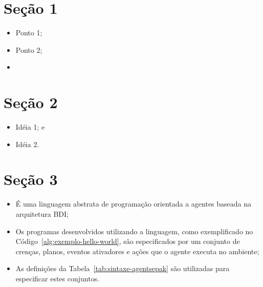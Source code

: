 \documentclass[a0,portrait]{a0poster}
\begin{document}
\begin{multicols}{2} 
\color{NavyBlue}
\section*{\huge Seção 1}
\color{Black}
\Large
\justifying

\begin{itemize}
	\item Ponto 1;
	\item Ponto 2;
	\item 
\end{itemize}

\color{NavyBlue}
\section*{\huge Seção 2}
\color{Black}

\begin{itemize}
	\item Idéia 1; e
	\item Idéia 2.
\end{itemize}

\color{NavyBlue}
\section*{\huge Seção 3}
\color{Black}

\begin{itemize}
	\item É uma linguagem abstrata de programação orientada a agentes baseada na arquitetura BDI;
	\item Os programas desenvolvidos utilizando a linguagem, como exemplificado no Código~\ref{alg:exemplo-hello-world}, são especificados por um conjunto de crenças, planos, eventos ativadores e ações que o agente executa no ambiente;
	\item As definições da Tabela~\ref{tab:sintaxe-agentsepak} são utilizadas para especificar estes conjuntos.
\end{itemize}


\end{multicols}
\end{document}
